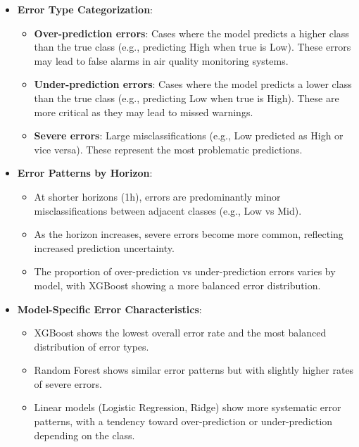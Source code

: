 \documentclass[12pt,a4paper]{article}
\begin{document}
\begin{itemize}
    \item \textbf{Error Type Categorization}:
    \begin{itemize}
        \item \textbf{Over-prediction errors}: Cases where the model predicts a higher class than the true class (e.g., predicting High when true is Low). These errors may lead to false alarms in air quality monitoring systems.
        \item \textbf{Under-prediction errors}: Cases where the model predicts a lower class than the true class (e.g., predicting Low when true is High). These are more critical as they may lead to missed warnings.
        \item \textbf{Severe errors}: Large misclassifications (e.g., Low predicted as High or vice versa). These represent the most problematic predictions.
    \end{itemize}
    
    \item \textbf{Error Patterns by Horizon}:
    \begin{itemize}
        \item At shorter horizons (1h), errors are predominantly minor misclassifications between adjacent classes (e.g., Low vs Mid).
        \item As the horizon increases, severe errors become more common, reflecting increased prediction uncertainty.
        \item The proportion of over-prediction vs under-prediction errors varies by model, with XGBoost showing a more balanced error distribution.
    \end{itemize}
    
    \item \textbf{Model-Specific Error Characteristics}:
    \begin{itemize}
        \item XGBoost shows the lowest overall error rate and the most balanced distribution of error types.
        \item Random Forest shows similar error patterns but with slightly higher rates of severe errors.
        \item Linear models (Logistic Regression, Ridge) show more systematic error patterns, with a tendency toward over-prediction or under-prediction depending on the class.
    \end{itemize}
    

\end{itemize}
\end{document}
